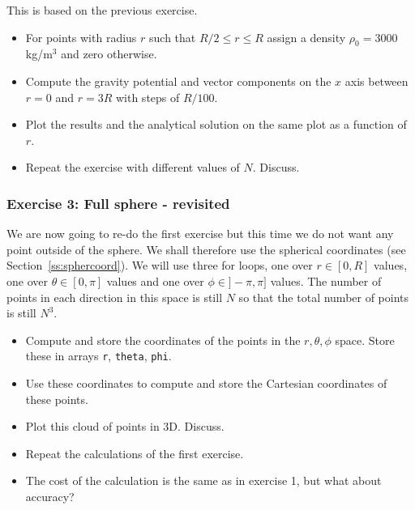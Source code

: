 This is based on the previous exercise. 
\begin{itemize}
\item For points with radius $r$ such that $R/2 \le r \le R$ assign a density $\rho_0=3000$kg/m$^3$ 
and zero otherwise.
\item Compute the gravity potential and vector components on the $x$ axis between $r=0$ and $r=3R$ 
with steps of $R/100$.
\item Plot the results and the analytical solution on the same plot as a function of $r$.
\item Repeat the exercise with different values of $N$. Discuss.
\end{itemize}

\subsubsection*{Exercise 3: Full sphere - revisited}

We are now going to re-do the first exercise but this time we do not want any point outside of the sphere. 
We shall therefore use the spherical coordinates (see Section~\ref{ss:sphercoord}).
We will use three for loops, one over $r\in[0,R]$ values, 
one over $\theta\in[0,\pi]$ values and one over $\phi\in]-\pi,\pi]$ values. The number 
of points in each direction in this space is still $N$ so that the total number of points is
still $N^3$.

\begin{itemize}
\item Compute and store the coordinates of the points in the $r,\theta,\phi$ space. Store 
these in arrays {\tt r}, {\tt theta}, {\tt phi}.
\item Use these coordinates to compute and store the Cartesian coordinates of these points. 
\item Plot this cloud of points in 3D. Discuss.
\item Repeat the calculations of the first exercise.
\item The cost of the calculation is the same as in exercise 1, but what about accuracy?
\end{itemize}

